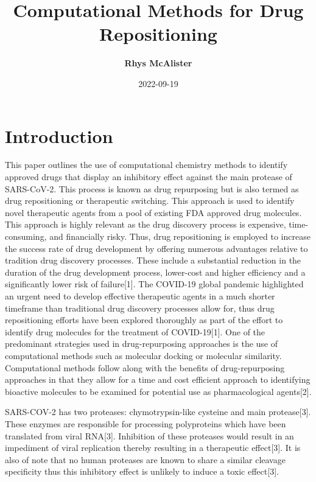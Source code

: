 \documentclass[
]{article}
\title{Computational Methods for Drug Repositioning}
\author{
\textbf{Rhys McAlister}\\}
\date{2022-09-19}
\begin{document}
\maketitle
\ifdefined\Shaded\renewenvironment{Shaded}{\begin{tcolorbox}[enhanced, interior hidden, breakable, boxrule=0pt, sharp corners, borderline west={3pt}{0pt}{shadecolor}, frame hidden]}{\end{tcolorbox}}\fi

\hypertarget{introduction}{%
\section{Introduction}\label{introduction}}

This paper outlines the use of computational chemistry methods to
identify approved drugs that display an inhibitory effect against the
main protease of SARS-CoV-2. This process is known as drug repurposing
but is also termed as drug repositioning or therapeutic switching. This
approach is used to identify novel therapeutic agents from a pool of
existing FDA approved drug molecules. This approach is highly relevant
as the drug discovery process is expensive, time-consuming, and
financially risky. Thus, drug repositioning is employed to increase the
success rate of drug development by offering numerous advantages
relative to tradition drug discovery processes. These include a
substantial reduction in the duration of the drug development process,
lower-cost and higher efficiency and a significantly lower risk of
failure{[}1{]}. The COVID-19 global pandemic highlighted an urgent need
to develop effective therapeutic agents in a much shorter timeframe than
traditional drug discovery processes allow for, thus drug repositioning
efforts have been explored thoroughly as part of the effort to identify
drug molecules for the treatment of COVID-19{[}1{]}. One of the
predominant strategies used in drug-repurposing approaches is the use of
computational methods such as molecular docking or molecular similarity.
Computational methods follow along with the benefits of drug-repurposing
approaches in that they allow for a time and cost efficient approach to
identifying bioactive molecules to be examined for potential use as
pharmacological agents{[}2{]}.

SARS-COV-2 has two proteases: chymotrypsin-like cysteine and main
protease{[}3{]}. These enzymes are responsible for processing
polyproteins which have been translated from viral RNA{[}3{]}.
Inhibition of these proteases would result in an impediment of viral
replication thereby resulting in a therapeutic effect{[}3{]}. It is also
of note that no human proteases are known to share a similar cleavage
specificity thus this inhibitory effect is unlikely to induce a toxic
effect{[}3{]}.
\end{document}
